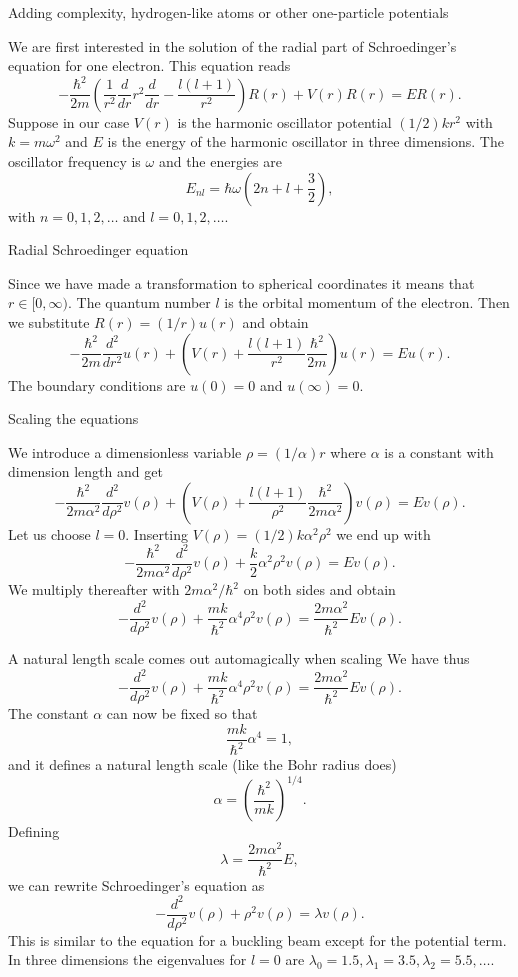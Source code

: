 \documentclass[graybox,envcountchap,sectrefs]{svmult}
\begin{document}
Adding complexity, hydrogen-like atoms or other one-particle potentials 

We are first interested in the solution of the radial part of Schroedinger's equation for one electron. This equation reads
\[
  -\frac{\hbar^2}{2 m} \left ( \frac{1}{r^2} \frac{d}{dr} r^2
  \frac{d}{dr} - \frac{l (l + 1)}{r^2} \right )R(r)
     + V(r) R(r) = E R(r).
\]
Suppose in our  case $V(r)$ is the harmonic oscillator potential $(1/2)kr^2$ with
$k=m\omega^2$ and $E$ is
the energy of the harmonic oscillator in three dimensions.
The oscillator frequency is $\omega$ and the energies are
\[
E_{nl}=  \hbar \omega \left(2n+l+\frac{3}{2}\right),
\]
with $n=0,1,2,\dots$ and $l=0,1,2,\dots$.

Radial Schroedinger equation

Since we have made a transformation to spherical coordinates it means that
$r\in [0,\infty)$.
The quantum number
$l$ is the orbital momentum of the electron.   Then we substitute $R(r) = (1/r) u(r)$ and obtain
\[
  -\frac{\hbar^2}{2 m} \frac{d^2}{dr^2} u(r)
       + \left ( V(r) + \frac{l (l + 1)}{r^2}\frac{\hbar^2}{2 m}
                                    \right ) u(r)  = E u(r) .
\]
The boundary conditions are $u(0)=0$ and $u(\infty)=0$.

Scaling the equations

We introduce a dimensionless variable $\rho = (1/\alpha) r$
where $\alpha$ is a constant with dimension length and get
\[
  -\frac{\hbar^2}{2 m \alpha^2} \frac{d^2}{d\rho^2} v(\rho)
       + \left ( V(\rho) + \frac{l (l + 1)}{\rho^2}
         \frac{\hbar^2}{2 m\alpha^2} \right ) v(\rho)  = E v(\rho) .
\]
Let us choose $l=0$.
Inserting $V(\rho) = (1/2) k \alpha^2\rho^2$ we end up with
\[
  -\frac{\hbar^2}{2 m \alpha^2} \frac{d^2}{d\rho^2} v(\rho)
       + \frac{k}{2} \alpha^2\rho^2v(\rho)  = E v(\rho) .
\]
We multiply thereafter with $2m\alpha^2/\hbar^2$ on both sides and obtain
\[
  -\frac{d^2}{d\rho^2} v(\rho)
       + \frac{mk}{\hbar^2} \alpha^4\rho^2v(\rho)  = \frac{2m\alpha^2}{\hbar^2}E v(\rho) .
\]

A natural length scale comes out automagically when scaling
We have thus
\[
  -\frac{d^2}{d\rho^2} v(\rho)
       + \frac{mk}{\hbar^2} \alpha^4\rho^2v(\rho)  = \frac{2m\alpha^2}{\hbar^2}E v(\rho) .
\]
The constant $\alpha$ can now be fixed
so that
\[
\frac{mk}{\hbar^2} \alpha^4 = 1,
\]
and it defines a natural length scale (like the Bohr radius does)
\[
\alpha = \left(\frac{\hbar^2}{mk}\right)^{1/4}.
\]
Defining
\[
\lambda = \frac{2m\alpha^2}{\hbar^2}E,
\]
we can rewrite Schroedinger's equation as
\[
  -\frac{d^2}{d\rho^2} v(\rho) + \rho^2v(\rho)  = \lambda v(\rho) .
\]
This is similar to the equation for a buckling beam except for the potential term.
In three dimensions
the eigenvalues for $l=0$ are
$\lambda_0=1.5,\lambda_1=3.5,\lambda_2=5.5,\dots .$
\end{document}
